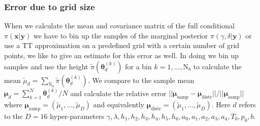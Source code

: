 \subsubsection{Error due to grid size}
When we calculate the mean and covariance matrix of the full conditional $\pi(\bm{x}|\bm{y})$ we have to bin up the samples of the marginal posterior $\pi(\gamma, \delta |\bm{y})$ or use a TT approximation on a predefined grid with a certain number of grid points, we like to give an estimate for this error as well.
In doing we bin up samples and use the height $\tilde{\pi}(\bm{\theta}^{(k)}_d)$ for a bin $k = 1, \dots, \text{N}_b$ to calculate the mean $\tilde{\mu}_d = \sum_{\text{N}_b} \tilde{\pi}(\bm{\theta}^{(k)}_d) $.
We compare to the sample mean $\bm{\mu}_d = \sum_{k=1}^N \bm{\theta}^{(k)}_d/N$ and calculate the relative error $||\bm{\mu}_{\text{samp}} -\bm{\mu}_{\text{distr}} ||/ || \bm{\mu}_{\text{samp}} ||$
where $\bm{\mu}_{\text{samp}} =(\tilde{\mu}_1, \dots , \tilde{\mu}_D) $ and equivalently $\bm{\mu}_{\text{distr}} =(\tilde{\mu}_1, \dots , \tilde{\mu}_D) $.
Here $d$ refers to the $D = 16$ hyper-parameters $\gamma, \lambda, h_1, h_2, h_3, h_4, h_5, h_6, a_0, a_1, a_2, a_3, a_4, T_0, p_0, b$.

